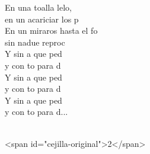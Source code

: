 \documentclass[12pt]{article}
\begin{document}
\begin{multicols*}{2}
\begin{cancion}
\begin{chorus}
	En una toalla lelo, \\
	en un acariciar los p\\
	En un miraros hasta el fo \\
	sin nadue reproc\\
	Y sin a que ped\\
	y con to para d\\
	Y sin a que ped\\
	y con to para d\\
	Y sin a que ped\\
	y con to para d...\\
	\end{chorus}%
	\jump\\
<span id="cejilla-original">2</span>\\
\end{cancion}%


\end{multicols*}
\end{document}
